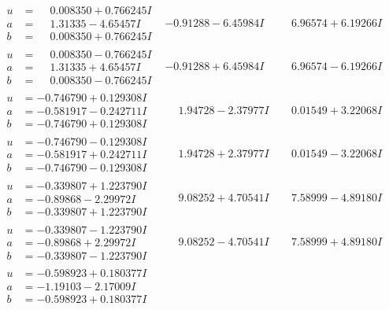 \documentclass[1p]{elsarticle_modified}
\theoremstyle{definition}
\begin{document}
$$\begin{array}{c|c|c}
\begin{aligned}
u &= \phantom{-}0.008350 + 0.766245 I \\
a &= \phantom{-}1.31335 - 4.65457 I \\
b &= \phantom{-}0.008350 + 0.766245 I\end{aligned}
 & -0.91288 - 6.45984 I & \phantom{-}6.96574 + 6.19266 I \\ \hline\begin{aligned}
u &= \phantom{-}0.008350 - 0.766245 I \\
a &= \phantom{-}1.31335 + 4.65457 I \\
b &= \phantom{-}0.008350 - 0.766245 I\end{aligned}
 & -0.91288 + 6.45984 I & \phantom{-}6.96574 - 6.19266 I \\ \hline\begin{aligned}
u &= -0.746790 + 0.129308 I \\
a &= -0.581917 - 0.242711 I \\
b &= -0.746790 + 0.129308 I\end{aligned}
 & \phantom{-}1.94728 - 2.37977 I & \phantom{-}0.01549 + 3.22068 I \\ \hline\begin{aligned}
u &= -0.746790 - 0.129308 I \\
a &= -0.581917 + 0.242711 I \\
b &= -0.746790 - 0.129308 I\end{aligned}
 & \phantom{-}1.94728 + 2.37977 I & \phantom{-}0.01549 - 3.22068 I \\ \hline\begin{aligned}
u &= -0.339807 + 1.223790 I \\
a &= -0.89868 - 2.29972 I \\
b &= -0.339807 + 1.223790 I\end{aligned}
 & \phantom{-}9.08252 + 4.70541 I & \phantom{-}7.58999 - 4.89180 I \\ \hline\begin{aligned}
u &= -0.339807 - 1.223790 I \\
a &= -0.89868 + 2.29972 I \\
b &= -0.339807 - 1.223790 I\end{aligned}
 & \phantom{-}9.08252 - 4.70541 I & \phantom{-}7.58999 + 4.89180 I \\ \hline\begin{aligned}
u &= -0.598923 + 0.180377 I \\
a &= -1.19103 - 2.17009 I \\
b &= -0.598923 + 0.180377 I\end{aligned}

\end{array}$$
\end{document}
